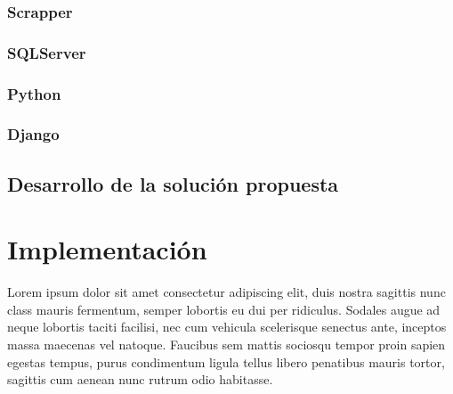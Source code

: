 \documentclass{article}
\begin{document}
\begin{table}[H]
\centering
{}
\caption{Comparativa}
\label{tab:comparativa_llm}
\end{table}

\subsubsection{Scrapper}
\subsubsection{SQLServer}
\subsubsection{Python}
\subsubsection{Django}

\subsection{Desarrollo de la solución propuesta}
\newpage

\section{Implementación}
Lorem ipsum dolor sit amet consectetur adipiscing elit, duis nostra sagittis nunc class mauris fermentum, semper lobortis eu dui per ridiculus. Sodales augue ad neque lobortis taciti facilisi, nec cum vehicula scelerisque senectus ante, inceptos massa maecenas vel natoque. Faucibus sem mattis sociosqu tempor proin sapien egestas tempus, purus condimentum ligula tellus libero penatibus mauris tortor, sagittis cum aenean nunc rutrum odio habitasse.
\end{document}
